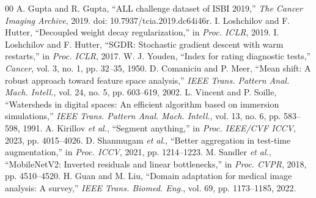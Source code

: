 \documentclass[journal,twoside,web]{ieeecolor}
\begin{document}
\begin{thebibliography}{00}
 A. Gupta and R. Gupta, ``ALL challenge dataset of ISBI 2019,'' \textit{The Cancer Imaging Archive}, 2019. doi: 10.7937/tcia.2019.dc64i46r.
 I. Loshchilov and F. Hutter, ``Decoupled weight decay regularization,'' in \textit{Proc. ICLR}, 2019.
 I. Loshchilov and F. Hutter, ``SGDR: Stochastic gradient descent with warm restarts,'' in \textit{Proc. ICLR}, 2017.
 W. J. Youden, ``Index for rating diagnostic tests,'' \textit{Cancer}, vol. 3, no. 1, pp. 32--35, 1950.
 D. Comaniciu and P. Meer, ``Mean shift: A robust approach toward feature space analysis,'' \textit{IEEE Trans. Pattern Anal. Mach. Intell.}, vol. 24, no. 5, pp. 603--619, 2002.
 L. Vincent and P. Soille, ``Watersheds in digital spaces: An efficient algorithm based on immersion simulations,'' \textit{IEEE Trans. Pattern Anal. Mach. Intell.}, vol. 13, no. 6, pp. 583--598, 1991.
 A. Kirillov \textit{et al.}, ``Segment anything,'' in \textit{Proc. IEEE/CVF ICCV}, 2023, pp. 4015--4026.
 D. Shanmugam \textit{et al.}, ``Better aggregation in test-time augmentation,'' in \textit{Proc. ICCV}, 2021, pp. 1214--1223.
 M. Sandler \textit{et al.}, ``MobileNetV2: Inverted residuals and linear bottlenecks,'' in \textit{Proc. CVPR}, 2018, pp. 4510--4520.
 H. Guan and M. Liu, ``Domain adaptation for medical image analysis: A survey,'' \textit{IEEE Trans. Biomed. Eng.}, vol. 69, pp. 1173--1185, 2022.
\end{thebibliography}
\end{document}
